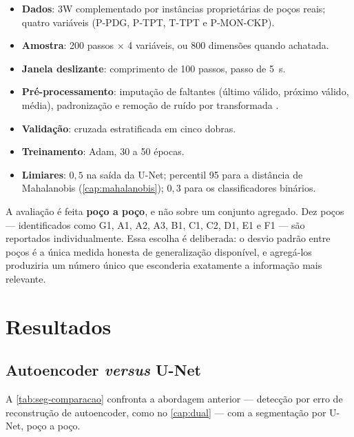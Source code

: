 \begin{itemize}[leftmargin=*,itemsep=0.3em]
  \item \textbf{Dados}: 3W complementado por instâncias proprietárias de poços reais;
        quatro variáveis (P-PDG, P-TPT, T-TPT e P-MON-CKP).
  \item \textbf{Amostra}: 200 passos $\times$ 4 variáveis, ou 800 dimensões quando
        achatada.
  \item \textbf{Janela deslizante}: comprimento de 100 passos, passo de \SI{5}{\second}.
  \item \textbf{Pré-processamento}: imputação de faltantes (último válido, próximo
        válido, média), padronização e remoção de ruído por transformada
        .
  \item \textbf{Validação}: cruzada estratificada em cinco dobras.
  \item \textbf{Treinamento}: Adam, 30 a 50 épocas.
  \item \textbf{Limiares}: $0{,}5$ na saída da U-Net; percentil 95 para a distância de
        Mahalanobis (\cref{cap:mahalanobis}); $0{,}3$ para os classificadores binários.
\end{itemize}

A avaliação é feita \textbf{poço a poço}, e não sobre um conjunto agregado. Dez poços
--- identificados como G1, A1, A2, A3, B1, C1, C2, D1, E1 e F1 --- são reportados
individualmente. Essa escolha é deliberada: o desvio padrão entre poços é a única
medida honesta de generalização disponível, e agregá-los produziria um número único que
esconderia exatamente a informação mais relevante.

\section{Resultados}

\subsection{Autoencoder \emph{versus} U-Net}

A \cref{tab:seg-comparacao} confronta a abordagem anterior --- detecção por erro de
reconstrução de autoencoder, como no \cref{cap:dual} --- com a segmentação por U-Net,
poço a poço.

